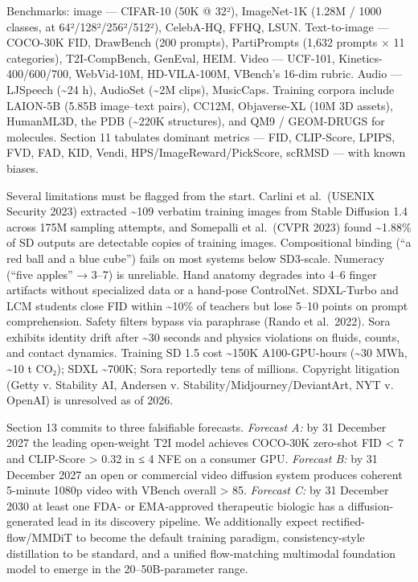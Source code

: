 Benchmarks: image --- CIFAR-10 (50K @ 32²), ImageNet-1K (1.28M / 1000 classes, at 64²/128²/256²/512²), CelebA-HQ, FFHQ, LSUN. Text-to-image --- COCO-30K FID, DrawBench (200 prompts), PartiPrompts (1,632 prompts × 11 categories), T2I-CompBench, GenEval, HEIM. Video --- UCF-101, Kinetics-400/600/700, WebVid-10M, HD-VILA-100M, VBench's 16-dim rubric. Audio --- LJSpeech (\textasciitilde24 h), AudioSet (\textasciitilde2M clips), MusicCaps. Training corpora include LAION-5B (5.85B image--text pairs), CC12M, Objaverse-XL (10M 3D assets), HumanML3D, the PDB (\textasciitilde220K structures), and QM9 / GEOM-DRUGS for molecules. Section 11 tabulates dominant metrics --- FID, CLIP-Score, LPIPS, FVD, FAD, KID, Vendi, HPS/ImageReward/PickScore, scRMSD --- with known biases.

Several limitations must be flagged from the start. Carlini et al.~(USENIX Security 2023) extracted \textasciitilde109 verbatim training images from Stable Diffusion 1.4 across 175M sampling attempts, and Somepalli et al.~(CVPR 2023) found \textasciitilde1.88\% of SD outputs are detectable copies of training images. Compositional binding (``a red ball and a blue cube'') fails on most systems below SD3-scale. Numeracy (``five apples'' → 3--7) is unreliable. Hand anatomy degrades into 4--6 finger artifacts without specialized data or a hand-pose ControlNet. SDXL-Turbo and LCM students close FID within \textasciitilde10\% of teachers but lose 5--10 points on prompt comprehension. Safety filters bypass via paraphrase (Rando et al.~2022). Sora exhibits identity drift after \textasciitilde30 seconds and physics violations on fluids, counts, and contact dynamics. Training SD 1.5 cost \textasciitilde150K A100-GPU-hours (\textasciitilde30 MWh, \textasciitilde10 t CO₂); SDXL \textasciitilde700K; Sora reportedly tens of millions. Copyright litigation (Getty v. Stability AI, Andersen v. Stability/Midjourney/DeviantArt, NYT v. OpenAI) is unresolved as of 2026.

Section 13 commits to three falsifiable forecasts. \emph{Forecast A:} by 31 December 2027 the leading open-weight T2I model achieves COCO-30K zero-shot FID \textless{} 7 and CLIP-Score \textgreater{} 0.32 in ≤ 4 NFE on a consumer GPU. \emph{Forecast B:} by 31 December 2027 an open or commercial video diffusion system produces coherent 5-minute 1080p video with VBench overall \textgreater{} 85. \emph{Forecast C:} by 31 December 2030 at least one FDA- or EMA-approved therapeutic biologic has a diffusion-generated lead in its discovery pipeline. We additionally expect rectified-flow/MMDiT to become the default training paradigm, consistency-style distillation to be standard, and a unified flow-matching multimodal foundation model to emerge in the 20--50B-parameter range.

